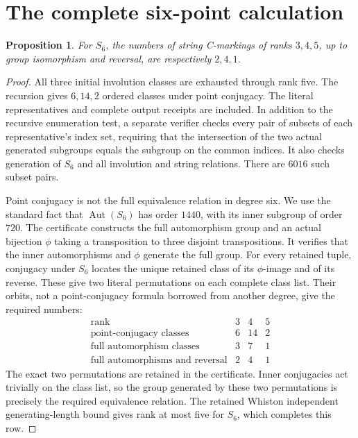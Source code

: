 \documentclass[11pt,a4paper]{article}
\newtheorem{proposition}[lemma]{Proposition}
\begin{document}
\section{The complete six-point calculation}
\begin{proposition}
For $S_6$, the numbers of string C-markings of ranks $3,4,5$, up to group
isomorphism and reversal, are respectively $2,4,1$.
\end{proposition}
\begin{proof}
All three initial involution classes are exhausted through rank five.
The recursion gives $6,14,2$ ordered classes under point conjugacy.
The literal representatives and complete output receipts are included. In addition to the recursive enumeration test, a separate verifier
checks every pair of subsets of each representative's index set, requiring
that the intersection of the two actual generated subgroups equals the
subgroup on the common indices. It also checks generation of $S_6$ and
all involution and string relations. There are $6016$ such subset pairs.

Point conjugacy is not the full equivalence relation in degree six.
We use the standard fact that $\operatorname{Aut}(S_6)$ has order $1440$,
with its inner subgroup of order $720$. The certificate constructs the full
automorphism group and an actual bijection $\phi$ taking a transposition to
three disjoint transpositions. It verifies that the inner automorphisms and
$\phi$ generate the full group. For every retained tuple, conjugacy under
$S_6$ locates the unique retained class of its $\phi$-image and of its reverse.
These give two literal permutations on each complete class list. Their
orbits, not a point-conjugacy formula borrowed from another degree, give the
required numbers:
\[
\begin{array}{c|rrr}
\text{rank}&3&4&5\\\hline
\text{point-conjugacy classes}&6&14&2\\
\text{full automorphism classes}&3&7&1\\
\text{full automorphisms and reversal}&2&4&1
\end{array}
\]
The exact two permutations are retained in the certificate. Inner
conjugacies act trivially on the class list, so the group generated by these
two permutations is precisely the required equivalence relation.
The retained Whiston independent generating-length bound gives rank at most five
for $S_6$, which completes this row.
\end{proof}
\end{document}

